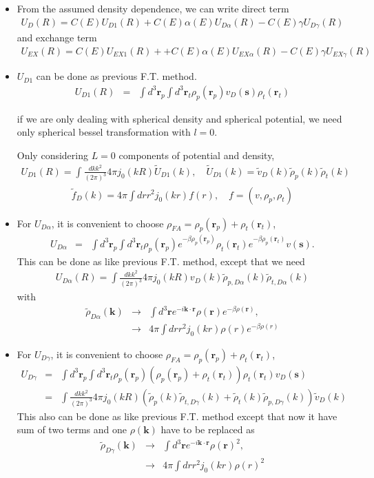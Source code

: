 \documentclass[11pt]{book}
\def\bm{\boldsymbol}
\def\vk{{\bm k}}
\def\vr{{\bm r}}
\newcommand{\bea}{\begin{eqnarray}}
\newcommand{\eea}{\end{eqnarray}}
\newcommand{\no}{\nonumber \\}
\begin{document}
\begin{itemize}
	\item From the assumed density dependence, we can write direct term 
	    \bea 
	    U_D(R) = C(E) U_{D1}(R)+C(E)\alpha(E) U_{D\alpha}(R)-C(E)\gamma U_{D\gamma}(R)
	    \eea 
	   and exchange term 
	   \bea 
	   U_{EX}(R) = C(E) U_{EX1}(R)++C(E)\alpha(E) U_{EX\alpha}(R)-C(E)\gamma U_{EX\gamma}(R)
	   \eea 
	\item $U_{D1}$ can be done as previous F.T. method.
	  \bea 
	   U_{D1}(R) &=& \int d^3 \vr_p \int d^3 \vr_t \rho_{p}(\vr_p) v_D({\bm s}) \rho_{t}(\vr_t)
	  \eea 
	  
	  if we are only dealing with spherical density and spherical potential, we need only 
	  spherical bessel transformation with $l=0$. 
	  
	  Only considering $L=0$ components of potential and density, 
	  \bea 
	  U_{D1}(R)=\int \frac{dk k^2}{(2\pi)^3} 4\pi  j_0(k R)\tilde{U}_{D1}(k),
	  \quad \tilde{U}_{D1}(k)= \tilde{v}_D(k) \tilde{\rho}_p(k) \tilde{\rho}_t(k) 
	  \eea 
	  \bea 
	  \tilde{f}_D(k)=4\pi \int d r r^2 j_0(kr) f(r), \quad f=(v,\rho_p,\rho_t)
	  \eea 
	  
	  
	\item For $U_{D\alpha}$, it is convenient to choose  $\rho_{FA} = \rho_{p}(\vr_p)+\rho_t(\vr_t)$,
	  \bea 
	  U_{D\alpha} &=& \int d^3 \vr_p \int d^3 \vr_t 
	  \rho_{p}(\vr_p)e^{-\beta\rho_{p}(\vr_p)} 
	  \rho_{t}(\vr_t)e^{-\beta\rho_{p}(\vr_t)} v({\bm s}). 
	  \eea 
	  This can be done as like previous F.T. method, except that we need 
	  \bea 
	  U_{D\alpha}(R) = \int \frac{dk k^2}{(2\pi)^3} 4\pi  j_0(k R) 
	      v_D(k)\tilde{\rho}_{p,D\alpha}(k) \tilde{\rho}_{t,D\alpha}(k) 
	  \eea 
	  with 
	  \bea 
	   \tilde{\rho}_{D\alpha}(\vk)&\to& 
	      \int d^3\vr e^{-i\vk\cdot\vr} \rho(\vr)e^{-\beta\rho(\vr)},\no 
	      &\to& 4\pi \int dr r^2 j_0(kr) \rho(r)e^{-\beta\rho(r)}
	  \eea 
	  
	  
	\item For $U_{D\gamma}$, it is convenient to choose  $\rho_{FA} = \rho_{p}(\vr_p)+\rho_t(\vr_t)$,
	  \bea 
	   U_{D\gamma}&=& \int d^3 \vr_p \int d^3 \vr_t 
	   \rho_{p}(\vr_p)(\rho_{p}(\vr_p)+\rho_{t}(\vr_t)) 
	   \rho_{t}(\vr_t) v_D({\bm s}) \no 
	   &=&\int \frac{dk k^2}{(2\pi)^3} 4\pi j_0(k R) \left( \tilde{\rho}_p(k)\tilde{\rho}_{t,D\gamma}(k)
	                                                    +\tilde{\rho}_t(k)\tilde{\rho}_{p,D\gamma}(k)  
	                                       \right) \tilde{v}_D(k)             
	  \eea  
	  This also can be done as like previous  F.T. method except that now it have sum of two terms
	  and one $\rho(\vk)$ have to be replaced as
	  \bea 
	  \tilde{\rho}_{D\gamma}(\vk)&\to& 
	  \int d^3\vr e^{-i\vk\cdot\vr} \rho(\vr)^2 ,\no 
	  &\to& 4\pi \int dr r^2 j_0(kr) \rho(r)^2 
	  \eea 
	  

\end{itemize}
\end{document}
